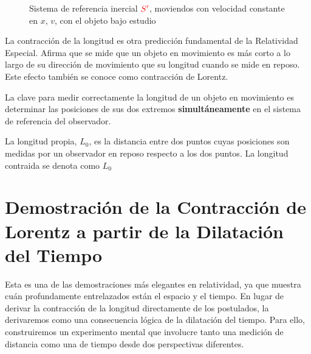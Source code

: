 \documentclass[11pt,a4paper]{article}
\begin{document}
\begin{figure}
    \caption{Sistema de referencia inercial $\color{red}S'$, moviendos con velocidad constante en $x$, $v$, con el objeto bajo estudio }
    \label{fig:movruler}
\end{figure}




La contracción de la longitud es otra predicción fundamental de la Relatividad Especial. Afirma que se mide que un objeto en movimiento es más corto a lo largo de su dirección de movimiento que su longitud cuando se mide en reposo. Este efecto también se conoce como contracción de Lorentz.

La clave para medir correctamente la longitud de un objeto en movimiento es determinar las posiciones de sus dos extremos \textbf{simultáneamente} en el sistema de referencia del observador.

La longitud propia, $L_0$, es la distancia entre dos puntos cuyas posiciones son medidas por un observador en reposo respecto a los dos puntos. La longitud contraida se denota como $L_0$


\section*{Demostración de la Contracción de Lorentz a partir de la Dilatación del Tiempo}

Esta es una de las demostraciones más elegantes en relatividad, ya que muestra cuán profundamente entrelazados están el espacio y el tiempo. En lugar de derivar la contracción de la longitud directamente de los postulados, la derivaremos como una consecuencia lógica de la dilatación del tiempo. Para ello, construiremos un experimento mental que involucre tanto una medición de distancia como una de tiempo desde dos perspectivas diferentes.
\end{document}
